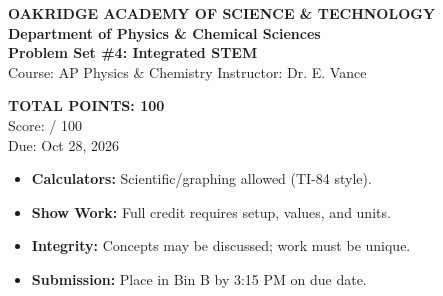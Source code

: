 \documentclass[11pt,a4paper]{article}
\begin{document}
\begin{tcolorbox}[
  enhanced,
  colback=NavyMain,
  colframe=NavyMain,
  arc=4pt,
  boxrule=0pt,
  top=3pt, bottom=3pt, left=8pt, right=8pt
]
  \begin{minipage}[c]{0.68\textwidth}
    \color{white}
    {\large \textbf{OAKRIDGE ACADEMY OF SCIENCE \& TECHNOLOGY}} \\[1pt]
    {\small \textbf{Department of Physics \& Chemical Sciences}} \\[2pt]
    {\Large \textbf{Problem Set \#4: Integrated STEM}} \\[1pt]
    {\footnotesize Course: AP Physics \& Chemistry \quad\textbar\quad Instructor: Dr. E. Vance}
  \end{minipage}%
  \hfill
  \begin{minipage}[c]{0.28\textwidth}
    \begin{tcolorbox}[
      colback=white,
      colframe=TealAccent,
      arc=3pt,
      boxrule=1pt,
      halign=center,
      top=2pt, bottom=2pt
    ]
      \color{NavyMain}
      \textbf{TOTAL POINTS: 100} \\[1pt]
      \small Score: \underline{\hspace{1.0cm}} / 100 \\[1pt]
      \scriptsize \faCalendar\:\: Due: Oct 28, 2026
    \end{tcolorbox}
  \end{minipage}
\end{tcolorbox}

\vspace{0.08cm}

\begin{tcolorbox}[infobox]
  \begin{minipage}[t]{0.48\textwidth}
    \begin{itemize}[leftmargin=1.1em, label=\textcolor{TealAccent}{\scriptsize\faCheckCircle}, itemsep=0pt]
      \item \textbf{Calculators:} Scientific/graphing allowed (TI-84 style).
      \item \textbf{Show Work:} Full credit requires setup, values, and units.
    \end{itemize}
  \end{minipage}%
  \hfill
  \begin{minipage}[t]{0.48\textwidth}
    \begin{itemize}[leftmargin=1.1em, label=\textcolor{TealAccent}{\scriptsize\faCheckCircle}, itemsep=0pt]
      \item \textbf{Integrity:} Concepts may be discussed; work must be unique.
      \item \textbf{Submission:} Place in Bin B by 3:15 PM on due date.
    \end{itemize}
  \end{minipage}
\end{tcolorbox}
\end{document}
